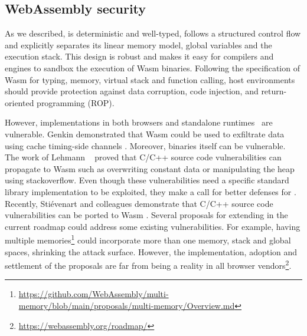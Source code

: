 







\subsection{WebAssembly security}

As we described, \wasm is deterministic and well-typed, follows a structured control flow and explicitly separates its linear memory model, global variables and the execution stack. This design is robust \cite{WebAssemblySecurity} and makes it easy for compilers and engines to sandbox the execution of Wasm  binaries. Following the specification of Wasm  for typing, memory, virtual stack and function calling,
host environments should provide protection against data corruption, code injection, and return-oriented programming (ROP).

However, implementations in both browsers and standalone runtimes~\cite{Narayan2021Swivel} are vulnerable.
Genkin \etal demonstrated that Wasm  could be used to exfiltrate data using cache timing-side channels \cite{Genkin2018DrivebyKC}.
Moreover, binaries itself can be vulnerable. The work of Lehmann \etal ~\cite{usenixWasm2020} proved that C/C++ source code vulnerabilities can propagate to Wasm  such as overwriting constant data or manipulating the heap using stackoverflow. Even though these vulnerabilities need a specific standard library implementation to be exploited, they make a call for better defenses for \wasm. 
Recently, Stiévenart and colleagues demonstrate that C/C++ source code vulnerabilities can be ported to Wasm \cite{DeRoover2022}.
Several proposals for extending \wasm in the current roadmap could address some existing vulnerabilities. For example, having multiple memories\footnote{\url{https://github.com/WebAssembly/multi-memory/blob/main/proposals/multi-memory/Overview.md}} could incorporate more than one memory, stack and global spaces, shrinking the attack surface. However, the implementation, adoption and settlement of the proposals are far from being a reality in all browser vendors\footnote{\url{https://webassembly.org/roadmap/}}. 
